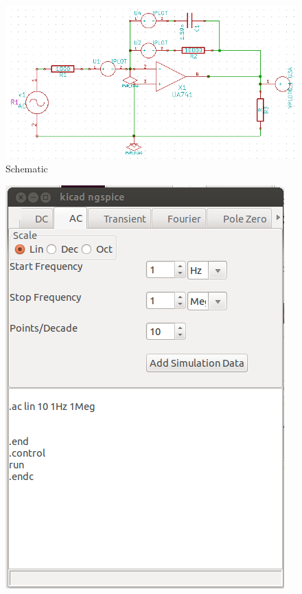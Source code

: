 \begin{enumerate}
\begin{figure}%
\begin{center}
\includegraphics[width=1\linewidth]{figures/apd33.png}%
\caption{Schematic}
\label{33}
\end{center}
\end{figure}
\begin{figure}%
\begin{center}
\includegraphics[width=1\linewidth]{figures/apd34.png}%

\end{center}
\end{figure}
\end{enumerate}
